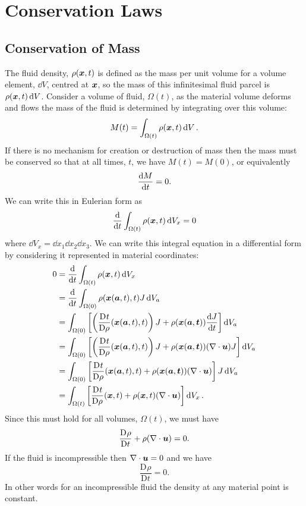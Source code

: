 \documentclass[a4paper]{article}
\newcommand{\mdv}[3][]{\frac{\mathrm{D}^{#1} #2}{\mathrm{D} {#3}^{#1}}}
\begin{document}
    \section{Conservation Laws}
    \subsection{Conservation of Mass}
    The fluid density, \(\rho(\bm{x}, t)\) is defined as the mass per unit volume for a volume element, \(\dd{V}\), centred at \(\bm{x}\), so the mass of this infinitesimal fluid parcel is \(\rho(\bm{x}, t)\dd{V}\).
    Consider a volume of fluid, \(\Omega(t)\), as the material volume deforms and flows the mass of the fluid is determined by integrating over this volume:
    \[M(t) = \int_{\Omega(t)} \rho(\bm{x}, t) \dd{V}.\]
    If there is no mechanism for creation or destruction of mass then the mass must be conserved so that at all times, \(t\), we have \(M(t) = M(0)\), or equivalently
    \[\dv{M}{t} = 0.\]
    We can write this in Eulerian form as
    \[\dv{t}\int_{\Omega(t)} \rho(\bm{x}, t) \dd{V_x} = 0\]
    where \(\dd{V_x} = \dd{x_1}\dd{x_2}\dd{x_3}\).
    We can write this integral equation in a differential form by considering it represented in material coordinates:
    \begin{align*}
        0 &= \dv{t} \int_{\Omega(t)} \rho(\vv{x}, t) \dd{V_x}\\
        &= \dv{t} \int_{\Omega(0)} \rho(\vv{x}(\vv{a}, t), t)J\dd{V_a}\\
        &= \int_{\Omega(0)} \left[ \left( \mdv{t}\rho(\vv{x}(\vv{a}, t), t) \right)J + \rho(\vv{x}(\vv{a}, \vv{t}))\dv{J}{t} \right]\dd{V_a}\\
        &= \int_{\Omega(0)} \left[ \left( \mdv{t}\rho(\vv{x}(\vv{a}, t), t) \right)J + \rho(\vv{x}(\vv{a}, \vv{t}))(\div\vv{u})J \right]\dd{V_a}\\
        &= \int_{\Omega(0)} \left[ \mdv{t}\rho(\vv{x}(\vv{a}, t), t) + \rho(\vv{x}(\vv{a}, \vv{t}))(\div\vv{u}) \right]J\dd{V_a}\\
        &= \int_{\Omega(t)} \left[ \mdv{t}\rho(\vv{x}, t) + \rho(\vv{x}, t)(\div\vv{u}) \right]\dd{V_x}.
    \end{align*}
    Since this must hold for all volumes, \(\Omega(t)\), we must have
    \[\mdv{\rho}{t} + \rho(\div\vv{u}) = 0.\]
    If the fluid is incompressible then \(\nabla\cdot\bm{u} = 0\) and we have
    \[\mdv{\rho}{t} = 0.\]
    In other words for an incompressible fluid the density at any material point is constant.
    
\end{document}
